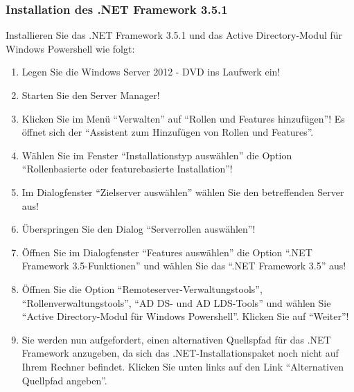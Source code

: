         \subsubsection{Installation des .NET Framework 3.5.1}
          Installieren Sie das .NET Framework 3.5.1 und das Active
          Directory-Modul für Windows Powershell wie folgt:
          \begin{enumerate}
              \item Legen Sie die Windows Server 2012 - DVD ins Laufwerk ein!
              \item Starten Sie den Server Manager!
              \item Klicken Sie im Menü \enquote{Verwalten} auf
              \enquote{Rollen und Features hinzufügen}! Es öffnet sich der
              \enquote{Assistent zum Hinzufügen von Rollen und Features}.
              \item Wählen Sie im Fenster \enquote{Installationstyp auswählen} die
              Option \enquote{Rollenbasierte oder featurebasierte Installation}!
              \item Im Dialogfenster \enquote{Zielserver auswählen} wählen Sie den
              betreffenden Server aus!
              \item Überspringen Sie den Dialog \enquote{Serverrollen auswählen}!
              \item Öffnen Sie im Dialogfenster \enquote{Features auswählen} die
              Option \enquote{.NET Framework 3.5-Funktionen} und wählen Sie das \enquote{.NET
              Framework 3.5} aus!
              \item Öffnen Sie die Option \enquote{Remoteserver-Verwaltungstools},
              \enquote{Rollenverwaltungstools}, \enquote{AD DS- und AD LDS-Tools}
              und wählen Sie \enquote{Active Directory-Modul für Windows
              Powershell}. Klicken Sie auf \enquote{Weiter}!
              \item Sie werden nun aufgefordert, einen alternativen Quellspfad für
              das .NET Framework anzugeben, da sich das .NET-Installationspaket noch
              nicht auf Ihrem Rechner befindet. Klicken Sie unten links auf den
              Link \enquote{Alternativen Quellpfad angeben}.
\end{enumerate}
